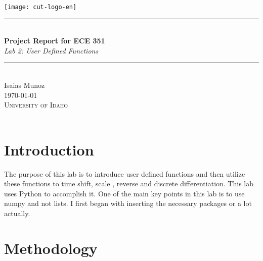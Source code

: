\documentclass[12pt,a4paper]{article}
\newcommand{\HRule}{\rule{\linewidth}{0.5mm}}
\begin{document}
\begin{titlepage}
\begin{center}
\texttt{[image: cut-logo-en]}~\\[2cm]
\HRule \\[0.4cm]
{ \LARGE 
  \textbf{Project Report for ECE 351}\\[0.4cm]
  \emph{Lab 2: User Defined Functions}\\[0.4cm]
}
\HRule \\[1.5cm]
{ \large
  Isaias Munoz  \\[0.1cm]
  \today\\[0.1cm]
}
\vfill
\textsc{\Large University of Idaho}\\
\\
 
\end{center}
\end{titlepage}
\newpage
\tableofcontents
{}
\newpage
\setcounter{page}{1}
\section{Introduction}\label{sec:intro}

The purpose of this lab is to introduce user defined functions and then utilize these functions to time shift, scale , reverse and discrete differentiation. This lab uses Python to accomplish it. One of the main key points in this lab is to use numpy and not lists. I first began with inserting the necessary packages or a lot actually.







\section{Methodology}\label{sec:meth}
\end{document}
